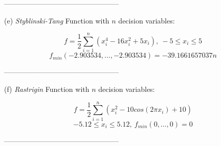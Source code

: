\documentclass[conference]{IEEEtran}
\begin{document}
\center------------------------------------------------

(e) \emph{Styblinski-Tang} Function with $n$ decision variables:

  \begin{displaymath}
     f=\frac{1}{2}\sum_{i=1}^{n}(x_i^4-16x_i^2+5x_i),~ -5\leq x_i \leq 5
      \end{displaymath}
  \begin{displaymath}
f_{min}(-2.903534,\ldots,-2.903534)=-39.1661657037n
  \end{displaymath}



\center------------------------------------------------

(f) \emph{Rastrigin} Function with $n$ decision variables:

  \begin{displaymath}
     f=\frac{1}{2}\sum_{i=1}^{n}(x_i^2-10cos(2\pi x_i)+10)
      \end{displaymath}
  \begin{displaymath}
 -5.12\leq x_i \leq 5.12, ~ f_{min}(0,\ldots,0)=0
  \end{displaymath}
    

 

\center------------------------------------------------



\end{document}
